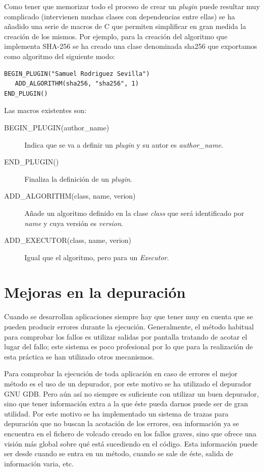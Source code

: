 Como tener que memorizar todo el proceso de crear un \emph{plugin} puede resultar muy complicado (intervienen muchas clases con dependencias entre ellas) se ha añadido una serie de macros de C que permiten simplificar en gran medida la creación de los mismos. Por ejemplo, para la creación del algoritmo que implementa SHA-256 se ha creado una clase denominada sha256 que exportamos como algoritmo del siguiente modo:

\begin{verbatim}
BEGIN_PLUGIN("Samuel Rodriguez Sevilla")
   ADD_ALGORITHM(sha256, "sha256", 1)
END_PLUGIN()
\end{verbatim}

Las macros existentes son:
\begin{description}
	\item[BEGIN\_PLUGIN(author\_name)] Indica que se va a definir un \emph{plugin} y su autor es \emph{author\_name}.
	
	\item[END\_PLUGIN()] Finaliza la definición de un \emph{plugin}.
	
	\item[ADD\_ALGORITHM(class, name, verion)] Añade un algoritmo definido en la clase \emph{class} que será identificado por \emph{name} y cuya versión es \emph{version}.
	
	\item[ADD\_EXECUTOR(class, name, verion)] Igual que el algoritmo, pero para un \emph{Executor}.
\end{description}

\section{Mejoras en la depuración}

Cuando se desarrollan aplicaciones siempre hay que tener muy en cuenta que se pueden producir errores durante la ejecución. Generalmente, el método habitual para comprobar los fallos es utilizar salidas por pantalla tratando de acotar el lugar del fallo; este sistema es poco profesional por lo que para la realización de esta práctica se han utilizado otros mecanismos.

Para comprobar la ejecución de toda aplicación en caso de errores el mejor método es el uso de un depurador, por este motivo se ha utilizado el depurador GNU GDB. Pero aún así no siempre es suficiente con utilizar un buen depurador, sino que tener información extra a la que éste pueda darnos puede ser de gran utilidad. Por este motivo se ha implementado un sistema de trazas para depuración que no buscan la acotación de los errores, esa información ya se encuentra en el fichero de volcado creado en los fallos graves, sino que ofrece una visión más global sobre qué está sucediendo en el código. Esta información puede ser desde cuando se entra en un método, cuando se sale de éste, salida de información varia, etc.

